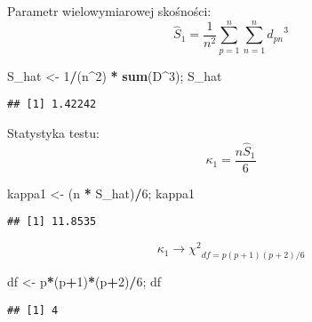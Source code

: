 \documentclass[polish,]{book}
\newenvironment{Shaded}{\begin{snugshade}}{\end{snugshade}}
\newcommand{\DecValTok}[1]{\textcolor[rgb]{0.00,0.00,0.81}{#1}}
\newcommand{\KeywordTok}[1]{\textcolor[rgb]{0.13,0.29,0.53}{\textbf{#1}}}
\newcommand{\NormalTok}[1]{#1}
\newcommand{\OperatorTok}[1]{\textcolor[rgb]{0.81,0.36,0.00}{\textbf{#1}}}
\newcommand{\StringTok}[1]{\textcolor[rgb]{0.31,0.60,0.02}{#1}}
\begin{document}
Parametr wielowymiarowej skośności:
\begin{equation}
\hat{S}_1=\frac{1}{n^2}\sum_{p=1}^{n}\sum_{n=1}^{n}{d_{pn}}^3
\label{eq:wz1133}
\end{equation}

\begin{Shaded}
\begin{Highlighting}[]
\NormalTok{S_hat <-}\StringTok{ }\DecValTok{1}\OperatorTok{/}\NormalTok{(n}\OperatorTok{^}\DecValTok{2}\NormalTok{) }\OperatorTok{*}\StringTok{ }\KeywordTok{sum}\NormalTok{(D}\OperatorTok{^}\DecValTok{3}\NormalTok{); S_hat}
\end{Highlighting}
\end{Shaded}

\begin{verbatim}
## [1] 1.42242
\end{verbatim}

Statystyka testu:
\begin{equation}
\kappa_1=\frac{n\hat{S}_1}{6}
\label{eq:wz1134}
\end{equation}

\begin{Shaded}
\begin{Highlighting}[]
\NormalTok{kappa1 <-}\StringTok{ }\NormalTok{(n }\OperatorTok{*}\StringTok{ }\NormalTok{S_hat)}\OperatorTok{/}\DecValTok{6}\NormalTok{; kappa1}
\end{Highlighting}
\end{Shaded}

\begin{verbatim}
## [1] 11.8535
\end{verbatim}

\begin{equation}
\kappa_1\longrightarrow {{\chi}^{2}}_{df=p(p+1)(p+2)/6}
\label{eq:wz1135}
\end{equation}

\begin{Shaded}
\begin{Highlighting}[]
\NormalTok{df <-}\StringTok{ }\NormalTok{p}\OperatorTok{*}\NormalTok{(p}\OperatorTok{+}\DecValTok{1}\NormalTok{)}\OperatorTok{*}\NormalTok{(p}\OperatorTok{+}\DecValTok{2}\NormalTok{)}\OperatorTok{/}\DecValTok{6}\NormalTok{; df}
\end{Highlighting}
\end{Shaded}

\begin{verbatim}
## [1] 4
\end{verbatim}
\end{document}
